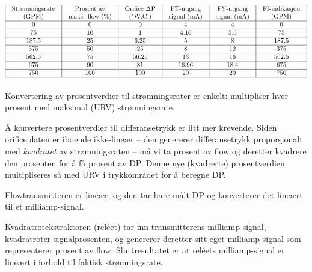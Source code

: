 

$$\vbox{\offinterlineskip
\halign{\strut
\vrule \quad\hfil # \ \hfil & 
\vrule \quad\hfil # \ \hfil & 
\vrule \quad\hfil # \ \hfil & 
\vrule \quad\hfil # \ \hfil & 
\vrule \quad\hfil # \ \hfil & 
\vrule \quad\hfil # \ \hfil \vrule \cr
\noalign{\hrule}
%
Strømningsrate & Prosent av & Orifice $\Delta$P & FT-utgang & FY-utgang & FI-indikasjon \cr
%
(GPM) & maks. flow (\%) & ("W.C.) & signal (mA) & signal (mA) & (GPM) \cr
%
\noalign{\hrule}
%
0 & 0 & 0 & 4 & 4 & 0 \cr
%
\noalign{\hrule}
%
75  & 10 & 1 & 4.16 & 5.6 & 75 \cr
%
\noalign{\hrule}
%
187.5  & 25 & 6.25 & 5 & 8 & 187.5 \cr
%
\noalign{\hrule}
%
375 & 50 & 25 & 8 & 12 & 375 \cr
%
\noalign{\hrule}
%
562.5 & 75 & 56.25 & 13 & 16 & 562.5 \cr
%
\noalign{\hrule}
%
675 & 90 & 81 & 16.96 & 18.4 & 675 \cr
%
\noalign{\hrule}
%
750 & 100 & 100 & 20 & 20 & 750 \cr
%
\noalign{\hrule}
} %
}$$ %

Konvertering av prosentverdier til strømningsrater er enkelt: multipliser hver prosent med maksimal (URV) strømningsrate.

\vskip 10pt

Å konvertere prosentverdier til differansetrykk er litt mer krevende.  Siden orificeplaten er iboende ikke-lineær -- den genererer differansetrykk proporsjonalt med {\it kvadratet} av strømningsraten -- må vi ta prosent av flow og deretter kvadrere den prosenten for å få prosent av DP.  Denne nye (kvadrerte) prosentverdien multipliseres så med URV i trykkområdet for å beregne DP.

\vskip 10pt

Flowtransmitteren er lineær, og den tar bare målt DP og konverterer det lineært til et milliamp-signal.

\vskip 10pt

Kvadratrotekstraktoren (reléet) tar inn transmitterens milliamp-signal, kvadratroter signalprosenten, og genererer deretter sitt eget milliamp-signal som representerer prosent av flow.  Sluttresultatet er at reléets milliamp-signal er lineært i forhold til faktisk strømningsrate.


